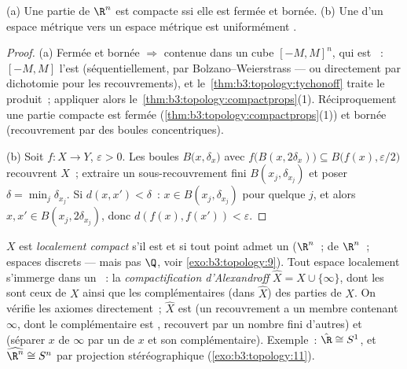 \begin{corollary}
\label{cor:b3:topology:heineborel}
(a) Une partie de $\R^n$ est compacte ssi elle est fermée et
bornée.
(b) Une  d'un espace métrique  vers
un espace métrique est uniformément .
\end{corollary}

\begin{proof}
(a) Fermée et bornée $\Rightarrow$ contenue dans un cube
$[-M,M]^n$, qui est ~: $[-M, M]$ l'est (séquentiellement,
par Bolzano--Weierstrass --- ou directement par dichotomie pour
les recouvrements), et le~\cref{thm:b3:topology:tychonoff}
traite le produit~; appliquer alors
le~\cref{thm:b3:topology:compactprops}(1). Réciproquement une
partie compacte est fermée
(\cref{thm:b3:topology:compactprops}(1)) et bornée
(recouvrement par des boules concentriques).

(b) Soit $f \colon X \to Y$, $\varepsilon > 0$. Les boules
$B\bigl(x, \delta_x\bigr)$ avec $f\bigl(B(x,
2\delta_x)\bigr)\subseteq B\bigl(f(x), \varepsilon/2\bigr)$
recouvrent $X$~; extraire un sous-recouvrement fini $B(x_j,
\delta_{x_j})$ et poser $\delta = \min_j \delta_{x_j}$. Si
$d(x, x') < \delta$~: $x \in B(x_j, \delta_{x_j})$ pour
quelque $j$, et alors $x, x' \in B(x_j, 2\delta_{x_j})$, donc
$d(f(x), f(x')) < \varepsilon$.
\end{proof}

\begin{definition}\label{def:b3:topology:locallycompact}
$X$ est \emph{localement compact} s'il est  et si tout point admet un 
 ($\R^n$~;  de $\R^n$~; espaces discrets --- mais
pas $\Q$, voir \cref{exo:b3:topology:9}). Tout espace localement
 s'immerge dans un ~: la
\emph{compactification d'Alexandroff} $\hat X = X \cup \{\infty\}$, dont les 
sont ceux de $X$ ainsi que les complémentaires (dans $\hat X$)
des parties  de $X$. On vérifie les axiomes
directement~; $\hat X$ est  (un recouvrement a un
membre contenant $\infty$, dont le complémentaire est ,
recouvert par un nombre fini d'autres) et  (séparer $x$
de $\infty$ par un   de $x$ et son
complémentaire). Exemple~: $\hat\R \cong S^1$, et
$\widehat{\R^n} \cong S^n$ par projection stéréographique
(\cref{exo:b3:topology:11}).
\end{definition}

